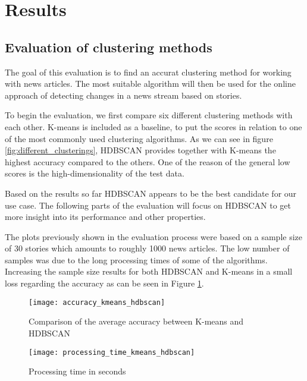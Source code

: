 \section{Results}

\subsection{Evaluation of clustering methods}

The goal of this evaluation is to find an accurat clustering method for working with news articles. The most suitable algorithm will then be used for the online approach of detecting changes in a news stream based on stories.


To begin the evaluation, we first compare six different clustering methods with each other. K-means is included as a baseline, to put the scores in relation to one of the most commonly used clustering algorithms. As we can see in figure \ref{fig:different_clusterings}, HDBSCAN provides together with K-means the highest accuracy compared to the others. One of the reason of the general low scores is the high-dimensionality of the test data.  



Based on the results so far HDBSCAN appears to be the best candidate for our use case. The following parts of the evaluation will focus on HDBSCAN to get more insight into its performance and other properties.


The plots previously shown in the evaluation process were based on a sample size of 30 stories which amounts to roughly 1000 news articles. The low number of samples was due to the long processing times of some of the algorithms. Increasing the sample size results for both HDBSCAN and K-means in a small loss regarding the accuracy as can be seen in Figure \ref{fig:accuracy_kmeans_hdbscan}.


\begin{figure}[h]
    \centering
    \texttt{[image: accuracy\_kmeans\_hdbscan]}
    \caption{Comparison of the average accuracy between K-means and HDBSCAN}
    \label{fig:accuracy_kmeans_hdbscan}
\end{figure}

\begin{figure}[h]
    \centering
    \texttt{[image: processing\_time\_kmeans\_hdbscan]}
    \caption{Processing time in seconds }
    \label{fig:processing_time_kmeans_hdbscan}
\end{figure}

